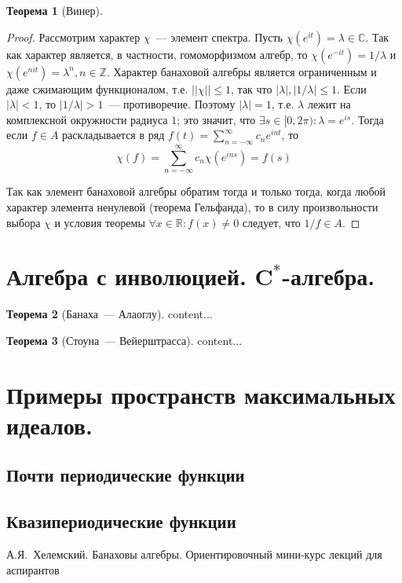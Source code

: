 \documentclass[12pt]{extarticle}
\theoremstyle{definition}
\newtheorem{theorem}{\indent Теорема}[section]
\begin{document}
\begin{theorem}[Винер]
\begin{proof}
		Рассмотрим характер $\chi$~--- элемент спектра. Пусть $\chi(e^{it})=\lambda\in\mathbb{C}$. Так как характер является, в частности, гомоморфизмом алгебр, то $\chi(e^{-it})=1/\lambda$ и $\chi(e^{nit})=\lambda^n,n\in\mathbb{Z}$. Характер банаховой алгебры является ограниченным и даже сжимающим функционалом, т.е. $||\chi||\leq 1$, так что $|\lambda|, |1/\lambda|\leq 1$. Если $|\lambda|<1$, то $|1/\lambda|>1$~--- противоречие. Поэтому $|\lambda|=1$, т.е. $\lambda$ лежит на комплексной окружности радиуса $1$; это значит, что $\exists s\in [0,2\pi)\colon \lambda=e^{is}$. Тогда если $f\in A$ раскладывается в ряд $f(t)=\sum_{n=-\infty}^{\infty} c_n e^{int}$, то
		$$\chi(f)=\sum_{n=-\infty}^{\infty} c_n \chi (e^{ins})=f(s)$$

		Так как элемент банаховой алгебры обратим тогда и только тогда, когда любой характер элемента ненулевой (теорема Гельфанда), то в силу произвольности выбора $\chi$ и условия теоремы $\forall x\in\mathbb{R}\colon  f(x)\neq 0$ следует, что $1/f\in A$.
    \end{proof}
        \end{theorem}

    \section{Алгебра с инволюцией. \(\symbf{C^*}\)-алгебра.}
        \begin{theorem}[Банаха~--- Алаоглу]\label{th:Alaoglu}
            content...
        \end{theorem}
        \begin{theorem}[Стоуна~--- Вейерштрасса]\label{th:StoneWrstrs}
            content...
        \end{theorem}

    \section[Примеры пространств максимальных идеалов]{Примеры пространств максимальных идеалов.}
        \subsection{Почти периодические функции}
        \subsection{Квазипериодические функции}
    \newpage
    \begin{thebibliography}{10}
        А.Я.~Хелемский. Банаховы алгебры. Ориентировочный мини-курс лекций для аспирантов
    \end{thebibliography}
\end{document}
